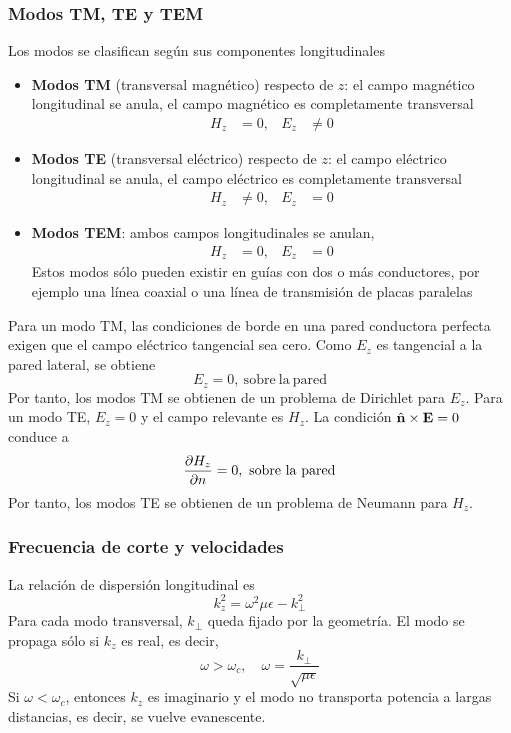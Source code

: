 \documentclass[]{article}
\numberwithin{equation}{section}
\begin{document}
\subsubsection{Modos TM, TE y TEM}
Los modos se clasifican según sus componentes longitudinales
\begin{itemize}
	\item \textbf{Modos TM} (transversal magnético) respecto de $z$: el campo magnético longitudinal se anula, el campo magnético es completamente transversal
	\begin{align}
		H_z &= 0, & E_z &\neq 0
	\end{align}
	\item \textbf{Modos TE} (transversal eléctrico) respecto de $z$: el campo eléctrico longitudinal se anula, el campo eléctrico es completamente transversal
	\begin{align}
	H_z &\neq 0, & E_z &= 0
	\end{align}
	\item \textbf{Modos TEM}: ambos campos longitudinales se anulan,
	\begin{align}
		H_z &= 0, & E_z &= 0
	\end{align}
	Estos modos sólo pueden existir en guías con dos o más conductores, por ejemplo una línea	coaxial o una línea de transmisión de placas paralelas
\end{itemize}
Para un modo TM, las condiciones de borde en una pared conductora perfecta exigen que el campo eléctrico tangencial sea cero. Como $E_z$ es tangencial a la pared lateral, se obtiene
\begin{equation}
	E_z = 0, \mathrm{\ sobre \ la \ pared}
\end{equation}
Por tanto, los modos TM se obtienen de un problema de Dirichlet para $E_z$. Para un modo TE, $E_z = 0$ y el campo relevante es $H_z$. La condición $\hat{\mathbf{n}}\times\mathbf{E} = 0$ conduce a
\begin{equation}
	\dfrac{\partial H_z}{\partial n} = 0, \mathrm{\ sobre \ la \ pared}
\end{equation}
Por tanto, los modos TE se obtienen de un problema de Neumann para $H_z$.

\subsubsection{Frecuencia de corte y velocidades}
La relación de dispersión longitudinal es
\begin{equation}
	k_z^2 = \omega^2\mu\epsilon - k_\perp^2
\end{equation}
Para cada modo transversal, $k_\perp$ queda fijado por la geometría. El modo se propaga sólo si $k_z$ es real, es decir,
\begin{equation}
	\omega > \omega_c, \quad \omega = \frac{k_\perp}{\sqrt{\mu\epsilon}}
\end{equation}
Si $\omega < \omega_c$, entonces $k_z$ es imaginario y el modo no transporta potencia a largas distancias, es decir, se vuelve evanescente.
\end{document}

